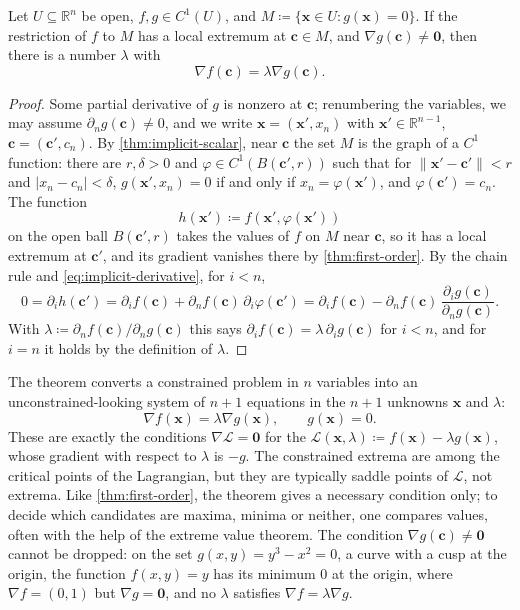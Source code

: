 \begin{theorem}
\label{thm:lagrange-one}
Let $U\subseteq\mathbb R^n$ be open, $f,g\in C^1(U)$, and $M\coloneqq\{\mathbf x\in U: g(\mathbf x)=0\}$. If the restriction of $f$ to $M$ has a local extremum at $\mathbf c\in M$, and $\nabla g(\mathbf c)\ne\mathbf0$, then there is a number $\lambda$ with
\[
\nabla f(\mathbf c)=\lambda\nabla g(\mathbf c).
\]
\end{theorem}

\begin{proof}
Some partial derivative of $g$ is nonzero at $\mathbf c$; renumbering the variables, we may assume $\partial_ng(\mathbf c)\ne0$, and we write $\mathbf x=(\mathbf x',x_n)$ with $\mathbf x'\in\mathbb R^{n-1}$, $\mathbf c=(\mathbf c',c_n)$. By \cref{thm:implicit-scalar}, near $\mathbf c$ the set $M$ is the graph of a $C^1$ function: there are $r,\delta>0$ and $\varphi\in C^1(B(\mathbf c',r))$ such that for $\|\mathbf x'-\mathbf c'\|<r$ and $|x_n-c_n|<\delta$, $g(\mathbf x',x_n)=0$ if and only if $x_n=\varphi(\mathbf x')$, and $\varphi(\mathbf c')=c_n$. The function
\[
h(\mathbf x')\coloneqq f(\mathbf x',\varphi(\mathbf x'))
\]
on the open ball $B(\mathbf c',r)$ takes the values of $f$ on $M$ near $\mathbf c$, so it has a local extremum at $\mathbf c'$, and its gradient vanishes there by \cref{thm:first-order}. By the chain rule and \eqref{eq:implicit-derivative}, for $i<n$,
\[
0=\partial_ih(\mathbf c')=\partial_if(\mathbf c)+\partial_nf(\mathbf c)\,\partial_i\varphi(\mathbf c')=\partial_if(\mathbf c)-\partial_nf(\mathbf c)\,\frac{\partial_ig(\mathbf c)}{\partial_ng(\mathbf c)} .
\]
With $\lambda\coloneqq\partial_nf(\mathbf c)/\partial_ng(\mathbf c)$ this says $\partial_if(\mathbf c)=\lambda\,\partial_ig(\mathbf c)$ for $i<n$, and for $i=n$ it holds by the definition of $\lambda$.
\end{proof}

The theorem converts a constrained problem in $n$ variables into an unconstrained-looking system of $n+1$ equations in the $n+1$ unknowns $\mathbf x$ and $\lambda$:
\[
\nabla f(\mathbf x)=\lambda\nabla g(\mathbf x),\qquad g(\mathbf x)=0 .
\]
These are exactly the conditions $\nabla\mathcal L=\mathbf0$ for the  $\mathcal L(\mathbf x,\lambda)\coloneqq f(\mathbf x)-\lambda g(\mathbf x)$, whose gradient with respect to $\lambda$ is $-g$. The constrained extrema are among the critical points of the Lagrangian, but they are typically saddle points of $\mathcal L$, not extrema. Like \cref{thm:first-order}, the theorem gives a necessary condition only; to decide which candidates are maxima, minima or neither, one compares values, often with the help of the extreme value theorem. The condition $\nabla g(\mathbf c)\ne\mathbf0$ cannot be dropped: on the set $g(x,y)=y^3-x^2=0$, a curve with a cusp at the origin, the function $f(x,y)=y$ has its minimum $0$ at the origin, where $\nabla f=(0,1)$ but $\nabla g=\mathbf0$, and no $\lambda$ satisfies $\nabla f=\lambda\nabla g$.

